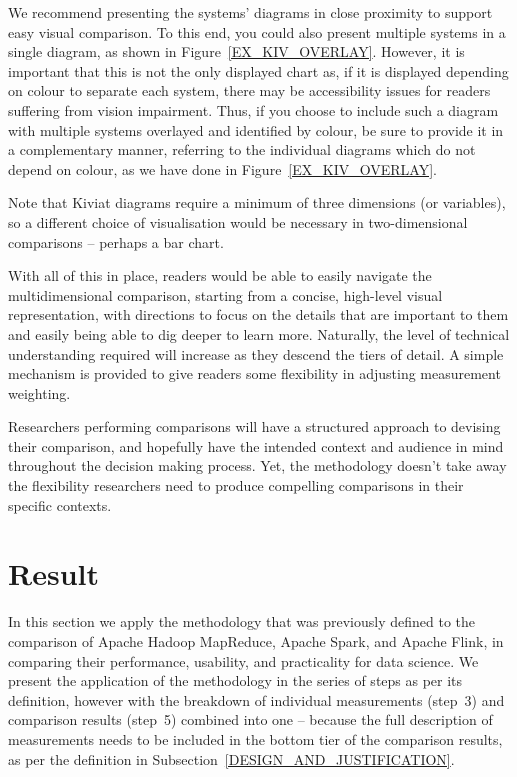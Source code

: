 \begin{description}
      We recommend presenting the systems' diagrams in close proximity to support easy visual comparison. To this end, you could also present multiple systems in a single diagram, as shown in Figure~\ref{EX_KIV_OVERLAY}. However, it is important that this is not the only displayed chart as, if it is displayed depending on colour to separate each system, there may be accessibility issues for readers suffering from vision impairment. Thus, if you choose to include such a diagram with multiple systems overlayed and identified by colour, be sure to provide it in a complementary manner, referring to the individual diagrams which do not depend on colour, as we have done in Figure~\ref{EX_KIV_OVERLAY}.

      Note that Kiviat diagrams require a minimum of three dimensions (or variables), so a different choice of visualisation would be necessary in two-dimensional comparisons -- perhaps a bar chart.
  \end{description}

  With all of this in place, readers would be able to easily navigate the multidimensional comparison, starting from a concise, high-level visual representation, with directions to focus on the details that are important to them and easily being able to dig deeper to learn more. Naturally, the level of technical understanding required will increase as they descend the tiers of detail. A simple mechanism is provided to give readers some flexibility in adjusting measurement weighting.

  Researchers performing comparisons will have a structured approach to devising their comparison, and hopefully have the intended context and audience in mind throughout the decision making process. Yet, the methodology doesn't take away the flexibility researchers need to produce compelling comparisons in their specific contexts.


\section{Result}

  In this section we apply the methodology that was previously defined to the comparison of Apache Hadoop MapReduce, Apache Spark, and Apache Flink, in comparing their performance, usability, and practicality for data science. We present the application of the methodology in the series of steps as per its definition, however with the breakdown of individual measurements (step~3) and comparison results (step~5) combined into one -- because the full description of measurements needs to be included in the bottom tier of the comparison results, as per the definition in Subsection~\ref{DESIGN_AND_JUSTIFICATION}.


